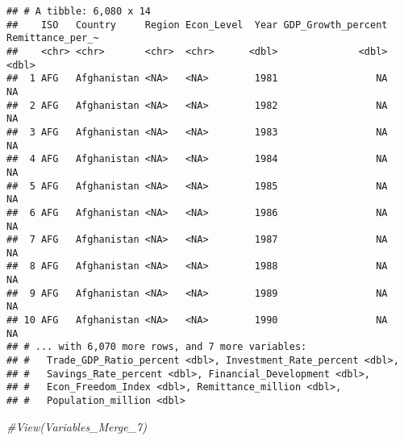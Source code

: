 \documentclass[
]{article}
\newenvironment{Shaded}{\begin{snugshade}}{\end{snugshade}}
\newcommand{\CommentTok}[1]{\textcolor[rgb]{0.56,0.35,0.01}{\textit{#1}}}
\begin{document}
\begin{verbatim}
## # A tibble: 6,080 x 14
##    ISO   Country     Region Econ_Level  Year GDP_Growth_percent Remittance_per_~
##    <chr> <chr>       <chr>  <chr>      <dbl>              <dbl>            <dbl>
##  1 AFG   Afghanistan <NA>   <NA>        1981                 NA               NA
##  2 AFG   Afghanistan <NA>   <NA>        1982                 NA               NA
##  3 AFG   Afghanistan <NA>   <NA>        1983                 NA               NA
##  4 AFG   Afghanistan <NA>   <NA>        1984                 NA               NA
##  5 AFG   Afghanistan <NA>   <NA>        1985                 NA               NA
##  6 AFG   Afghanistan <NA>   <NA>        1986                 NA               NA
##  7 AFG   Afghanistan <NA>   <NA>        1987                 NA               NA
##  8 AFG   Afghanistan <NA>   <NA>        1988                 NA               NA
##  9 AFG   Afghanistan <NA>   <NA>        1989                 NA               NA
## 10 AFG   Afghanistan <NA>   <NA>        1990                 NA               NA
## # ... with 6,070 more rows, and 7 more variables:
## #   Trade_GDP_Ratio_percent <dbl>, Investment_Rate_percent <dbl>,
## #   Savings_Rate_percent <dbl>, Financial_Development <dbl>,
## #   Econ_Freedom_Index <dbl>, Remittance_million <dbl>,
## #   Population_million <dbl>
\end{verbatim}

\begin{Shaded}
\begin{Highlighting}[]
\CommentTok{\#View(Variables\_Merge\_7)}
\end{Highlighting}
\end{Shaded}
\end{document}
